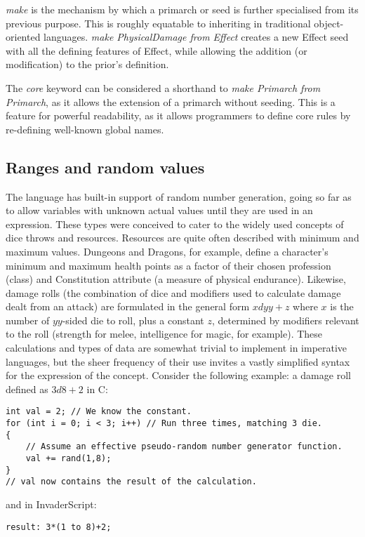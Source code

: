 \emph{make} is the mechanism by which a primarch or seed is further specialised from its previous purpose. This is roughly equatable to inheriting in traditional object-oriented languages. \emph{make PhysicalDamage from Effect} creates a new Effect seed with all the defining features of Effect, while allowing the addition (or modification) to the prior's definition.

The \emph{core} keyword can be considered a shorthand to \emph{make Primarch from Primarch}, as it allows the extension of a primarch without seeding. This is a feature for powerful readability, as it allows programmers to define core rules by re-defining well-known global names.

\subsection{Ranges and random values}
The language has built-in support of random number generation, going so far as to allow variables with unknown actual values until they are used in an expression. These types were conceived to cater to the widely used concepts of dice throws and resources. Resources are quite often described with minimum and maximum values. Dungeons and Dragons, for example, define a character's minimum and maximum health points as a factor of their chosen profession (class) and Constitution attribute (a measure of physical endurance). Likewise, damage rolls (the combination of dice and modifiers used to calculate damage dealt from an attack) are formulated in the general form $xdyy+z$ where $x$ is the number of $yy$-sided die to roll, plus a constant $z$, determined by modifiers relevant to the roll (strength for melee, intelligence for magic, for example). These calculations and types of data are somewhat trivial to implement in imperative languages, but the sheer frequency of their use invites a vastly simplified syntax for the expression of the concept. Consider the following example: a damage roll defined as $3d8+2$ in C:
\begin{lstlisting}
int val = 2; // We know the constant.
for (int i = 0; i < 3; i++) // Run three times, matching 3 die.
{
    // Assume an effective pseudo-random number generator function.
    val += rand(1,8);
}
// val now contains the result of the calculation.
\end{lstlisting}
and in InvaderScript:
\begin{lstlisting}
result: 3*(1 to 8)+2;
\end{lstlisting}

